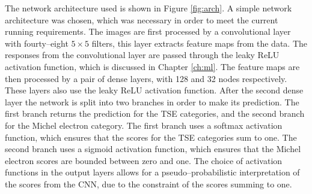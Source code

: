The network architecture used is shown in Figure \ref{fig:arch}. A simple
network architecture was chosen, which was necessary in order to meet the 
current running requirements. The images are first processed by a convolutional 
layer with fourty--eight $5 \times 5$ filters, this layer extracts feature 
maps from the data. The responses from the convolutional layer are passed 
through the leaky ReLU activation function, which is discussed in Chapter 
\ref{ch:ml}. The feature maps are then processed by a pair of dense layers, 
with 128 and 32 nodes respectively.  These layers also use the leaky ReLU 
activation function. After the second dense layer the network is split into 
two branches in order to make its prediction. The first branch returns the 
prediction for the TSE categories, and the second branch for the Michel 
electron category. The first branch uses a softmax activation function, which 
ensures that the scores for the TSE categories sum to one.  The second branch 
uses a sigmoid activation function, which ensures that the Michel electron 
scores are bounded between zero and one. The choice of activation functions in 
the output layers allows for a pseudo--probabilistic interpretation of the 
scores from the CNN, due to the constraint of the scores summing to one.

